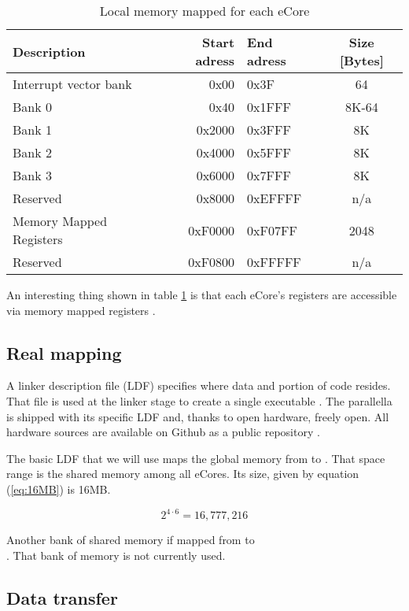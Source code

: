 \begin{table}[h]
\centering
\caption{Local memory mapped for each eCore}
\label{table:eCore}
\begin{tabular}{|l|r|l|c|}
  \hline
  Description & Start adress & End adress & Size [Bytes] \\
  \hline
  Interrupt vector bank & 0x00 & 0x3F & 64 \\
  Bank 0 & 0x40 & 0x1FFF & 8K-64 \\
  Bank 1 & 0x2000 & 0x3FFF & 8K \\
  Bank 2 & 0x4000 & 0x5FFF & 8K \\
  Bank 3 & 0x6000 & 0x7FFF & 8K \\
  Reserved & 0x8000 & 0xEFFFF & n/a \\
  Memory Mapped Registers & 0xF0000 & 0xF07FF & 2048 \\
  Reserved & 0xF0800 & 0xFFFFF & n/a \\ 
  \hline
\end{tabular}
\end{table}

An interesting thing shown in table \ref{table:eCore} is that each \gls{eCore}'s registers are accessible via memory mapped registers \cite{parallellamanual}.

\subsection{Real mapping}
A linker description file (\gls{LDF}) specifies where data and portion of code resides. That file is used at the linker stage to create a single executable \cite{linker}. The parallella is shipped with its specific \gls{LDF} and, thanks to open hardware, freely open. All hardware sources are available on Github as a public repository \cite{githubadaptevahard}.

The basic \gls{LDF} that we will use maps the global memory from  to . That space range is the shared memory among all \glspl{eCore}. Its size, given by equation (\ref{eq:16MB}) is 16MB.

\begin{equation}
	2^{4\cdot6} = 16,777,216
	\label{eq:16MB}
\end{equation}

Another bank of shared memory if mapped from  to\\ . That bank of memory is not currently used.

\subsection{Data transfer}

